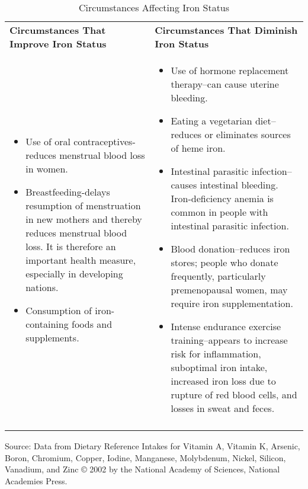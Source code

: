 \documentclass[title={Chapter 9}]{fdsn201notes}
\begin{document}
\begin{table}[H]
	\centering
	\begin{threeparttable}
		\caption{Circumstances Affecting Iron Status}
		\label{tab:circumstances-affecting-iron-status}
		\begin{tabular}{p{} p{}}
			\rowcolor{rowdarkgreen}\textbf{Circumstances That Improve Iron Status} & \textbf{Circumstances That Diminish Iron Status}\\
			\begin{itemize}
				\item Use of oral contraceptives-reduces menstrual blood loss in women.
				\item Breastfeeding-delays resumption of menstruation in new mothers and thereby reduces menstrual blood loss. It is therefore an important health measure, especially in developing nations.
				\item Consumption of iron-containing foods and supplements.
			\end{itemize}
			& \begin{itemize}
				\item Use of hormone replacement therapy--can cause uterine bleeding.
				\item Eating a vegetarian diet--reduces or eliminates sources of heme iron.
				\item Intestinal parasitic infection--causes intestinal bleeding. Iron-deficiency anemia is common in people with intestinal parasitic infection.
				\item Blood donation--reduces iron stores; people who donate frequently,
				  particularly premenopausal women, may require iron supplementation.
				\item Intense endurance exercise training--appears to increase risk for inflammation, suboptimal iron intake, increased iron loss due to rupture of red blood cells, and losses in sweat and feces.
			\end{itemize}\\
			\rowcolor{rowdarkgreen} & \\
		\end{tabular}
		\begin{tablenotes}
			\small
			\item Source: Data from Dietary Reference Intakes for Vitamin A, Vitamin K, Arsenic, Boron, Chromium, Copper, Iodine, Manganese, Molybdenum, Nickel, Silicon, Vanadium, and Zinc © 2002 by the National Academy of Sciences, National Academies Press.
		\end{tablenotes}
	\end{threeparttable}
\end{table}
\end{document}
